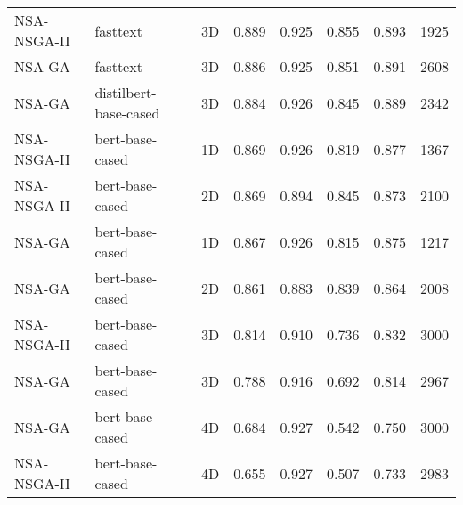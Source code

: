 \begin{table*}[h]
{\begin{tabular}{lllrrrrr}
NSA-NSGA-II & fasttext & 3D & 0.889 & 0.925 & 0.855 & 0.893 & 1925 \\
NSA-GA & fasttext & 3D & 0.886 & 0.925 & 0.851 & 0.891 & 2608 \\
NSA-GA & distilbert-base-cased & 3D & 0.884 & 0.926 & 0.845 & 0.889 & 2342 \\
NSA-NSGA-II & bert-base-cased & 1D & 0.869 & 0.926 & 0.819 & 0.877 & 1367 \\
NSA-NSGA-II & bert-base-cased & 2D & 0.869 & 0.894 & 0.845 & 0.873 & 2100 \\
NSA-GA & bert-base-cased & 1D & 0.867 & 0.926 & 0.815 & 0.875 & 1217 \\
NSA-GA & bert-base-cased & 2D & 0.861 & 0.883 & 0.839 & 0.864 & 2008 \\
NSA-NSGA-II & bert-base-cased & 3D & 0.814 & 0.910 & 0.736 & 0.832 & 3000 \\
NSA-GA & bert-base-cased & 3D & 0.788 & 0.916 & 0.692 & 0.814 & 2967 \\
NSA-GA & bert-base-cased & 4D & 0.684 & 0.927 & 0.542 & 0.750 & 3000 \\
NSA-NSGA-II & bert-base-cased & 4D & 0.655 & 0.927 & 0.507 & 0.733 & 2983 \\
\bottomrule
\end{tabular}
    }
\end{table*}
